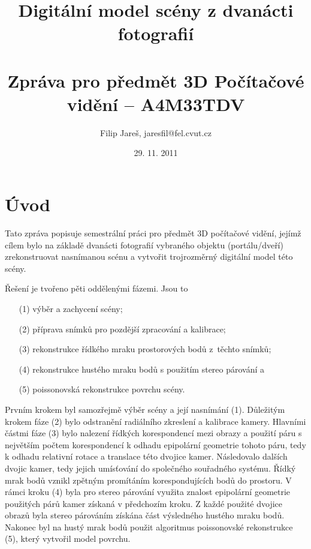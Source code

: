 \documentclass[11pt,oneside,a4paper,pdftex]{article}   %
\title{Digitální model scény z dvanácti fotografií \\ \ \\ \large Zpráva pro předmět 3D Počítačové vidění -- A4M33TDV}
\date{29. 11. 2011}
\author{Filip Jareš, jaresfil@fel.cvut.cz}
\begin{document}
\maketitle


\section*{Úvod}

	Tato zpráva popisuje semestrální práci pro předmět 3D počítačové vidění, jejímž cílem bylo na základě
	dvanácti fotografií vybraného objektu (portálu/dveří) zrekonstruovat nasnímanou scénu a vytvořit
	trojrozměrný digitální model této scény.
	
	Řešení je tvořeno pěti oddělenými fázemi. Jsou to
	\begin{enumerate}
		\item[(1)] výběr a zachycení scény;
		\item[(2)] příprava snímků pro pozdější zpracování a kalibrace;
		\item[(3)] rekonstrukce řídkého mraku prostorových bodů z~těchto snímků;
		\item[(4)] rekonstrukce hustého mraku bodů s použitím stereo párování a
		\item[(5)] poissonovská rekonstrukce povrchu scény.
	\end{enumerate}
	
	Prvním krokem byl samozřejmě výběr scény a její nasnímání (1).  Důležitým krokem fáze (2) bylo
	odstranění radiálního zkreslení a kalibrace kamery. Hlavními částmi fáze (3) bylo nalezení řídkých
	korespondencí mezi obrazy a použití páru s největším počtem korespondencí k odhadu epipolární
	geometrie tohoto páru, tedy k odhadu relativní rotace a translace této dvojice kamer.  Následovalo
	 dalších dvojic kamer, tedy jejich umísťování do společného souřadného systému. Řídký
	mrak bodů vznikl zpětným promítáním korespondujících bodů do prostoru. V rámci kroku (4) byla pro
	stereo párování využita znalost epipolární geometrie použitých párů kamer získaná v předchozím
	kroku.  Z každé použité dvojice obrazů byla stereo párováním získána část výsledného hustého mraku
	bodů.  Nakonec byl na hustý mrak bodů použit algoritmus poissonovské rekonstrukce (5), který vytvořil
	model povrchu.
	
\end{document}
